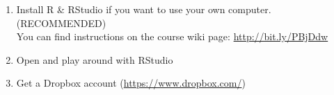 \documentclass{beamer}\usepackage{graphicx, color}
\begin{document}
\begin{CJK}{UTF8}{}
{\begin{enumerate}
      \item<2-> {\large{Install R \& RStudio if you want to use your own computer. (RECOMMENDED)}} \\[0.25cm]
      You can find instructions on the course wiki page: \url{http://bit.ly/PBjDdw}\\[0.5cm]
  
      \item <3->{\large{Open and play around with RStudio}}
      \item <4->{\large{Get a Dropbox account (\url{https://www.dropbox.com/})}}
    \end{enumerate}
}


\end{CJK}
\end{document}
